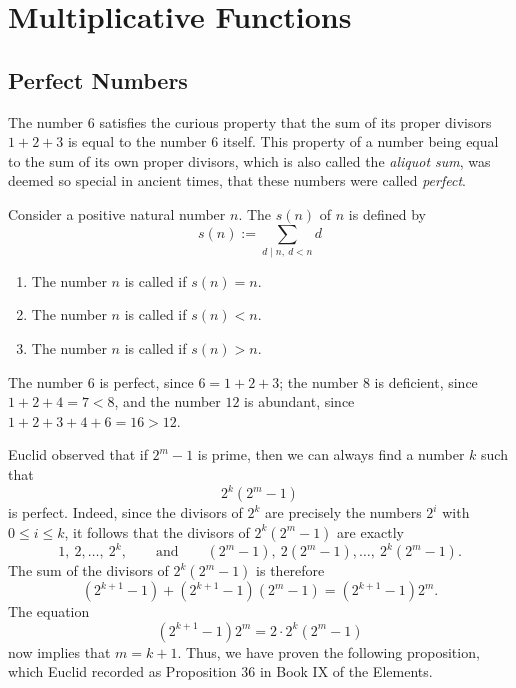 \chapter{Multiplicative Functions}

\section{Perfect Numbers}

The number $6$ satisfies the curious property that the sum of its proper divisors $1+2+3$ is equal to the number $6$ itself. This property of a number being equal to the sum of its own proper divisors, which is also called the \emph{aliquot sum}, was deemed so special in ancient times, that these numbers were called \emph{perfect}.

\begin{definition}
  Consider a positive natural number $n$. The  $s(n)$ of $n$ is defined by
  \begin{equation*}
    s(n):=\sum_{d\mid n,~d<n}d
  \end{equation*}
  \begin{enumerate}
  \item The number $n$ is called  if $s(n)=n$.
  \item The number $n$ is called  if $s(n)<n$.
  \item The number $n$ is called  if $s(n)>n$.
  \end{enumerate}
\end{definition}

\begin{example}
  The number $6$ is perfect, since $6=1+2+3$; the number $8$ is deficient, since $1+2+4=7<8$, and the number $12$ is abundant, since $1+2+3+4+6=16>12$.
\end{example}

Euclid observed that if $2^m-1$ is prime, then we can always find a number $k$ such that
\begin{equation*}
  2^k(2^m-1)
\end{equation*}
is perfect. Indeed, since the divisors of $2^k$ are precisely the numbers $2^i$ with $0\leq i\leq k$, it follows that the divisors of $2^k(2^m-1)$ are exactly
\begin{equation*}
  1,~2,\ldots,~2^k,\qquad\text{and}\qquad (2^m-1),~2(2^m-1),\ldots,~2^k(2^m-1).
\end{equation*}
The sum of the divisors of $2^k(2^m-1)$ is therefore
\begin{equation*}
  (2^{k+1}-1)+(2^{k+1}-1)(2^m-1)=(2^{k+1}-1)2^m.
\end{equation*}
The equation
\begin{equation*}
  (2^{k+1}-1)2^m=2\cdot 2^k(2^m-1)
\end{equation*}
now implies that $m=k+1$. Thus, we have proven the following proposition, which Euclid recorded as Proposition 36 in Book IX of the Elements.


